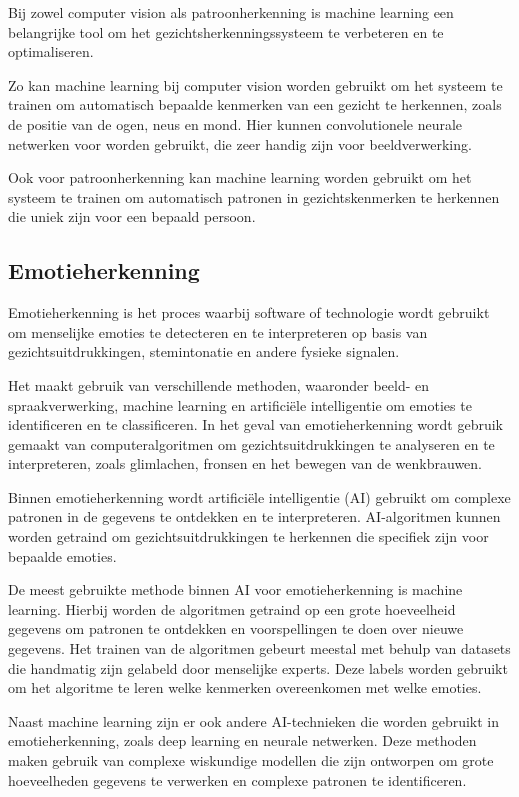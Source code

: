 Bij zowel computer vision als patroonherkenning is machine learning een belangrijke tool om het gezichtsherkenningssysteem te verbeteren en te optimaliseren.

Zo kan machine learning bij computer vision worden gebruikt om het systeem te trainen om automatisch bepaalde kenmerken van een gezicht te herkennen, zoals de positie van de ogen, neus en mond. Hier kunnen convolutionele neurale netwerken voor worden gebruikt, die zeer handig zijn voor beeldverwerking.

Ook voor patroonherkenning kan machine learning worden gebruikt om het systeem te trainen om automatisch patronen in gezichtskenmerken te herkennen die uniek zijn voor een bepaald persoon.

\subsection{Emotieherkenning}

Emotieherkenning is het proces waarbij software of technologie wordt gebruikt om menselijke emoties te detecteren en te interpreteren op basis van gezichtsuitdrukkingen, stemintonatie en andere fysieke signalen.

Het maakt gebruik van verschillende methoden, waaronder beeld- en spraakverwerking, machine learning en artificiële intelligentie om emoties te identificeren en te classificeren. In het geval van emotieherkenning wordt gebruik gemaakt van computeralgoritmen om gezichtsuitdrukkingen te analyseren en te interpreteren, zoals glimlachen, fronsen en het bewegen van de wenkbrauwen.

Binnen emotieherkenning wordt artificiële intelligentie (AI) gebruikt om complexe patronen in de gegevens te ontdekken en te interpreteren. AI-algoritmen kunnen worden getraind om gezichtsuitdrukkingen te herkennen die specifiek zijn voor bepaalde emoties.

De meest gebruikte methode binnen AI voor emotieherkenning is machine learning. Hierbij worden de algoritmen getraind op een grote hoeveelheid gegevens om patronen te ontdekken en voorspellingen te doen over nieuwe gegevens. Het trainen van de algoritmen gebeurt meestal met behulp van datasets die handmatig zijn gelabeld door menselijke experts. Deze labels worden gebruikt om het algoritme te leren welke kenmerken overeenkomen met welke emoties.

Naast machine learning zijn er ook andere AI-technieken die worden gebruikt in emotieherkenning, zoals deep learning en neurale netwerken. Deze methoden maken gebruik van complexe wiskundige modellen die zijn ontworpen om grote hoeveelheden gegevens te verwerken en complexe patronen te identificeren.

